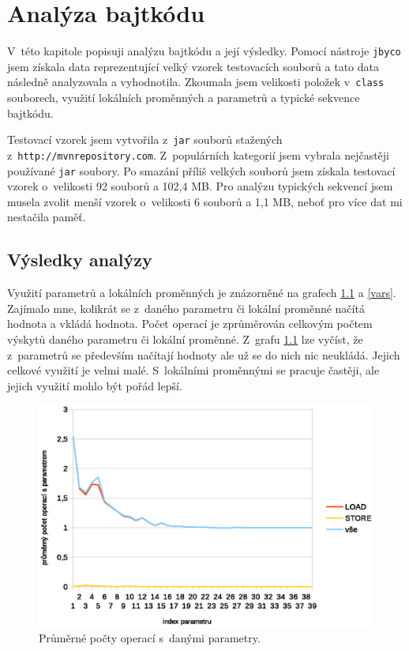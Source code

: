 \chapter{Analýza bajtkódu}\label{Analysis}


V~této kapitole popisuji analýzu bajtkódu a její výsledky. Pomocí nástroje \texttt{jbyco} jsem získala data reprezentující velký vzorek testovacích souborů a tato data následně analyzovala a vyhodnotila. Zkoumala jsem velikosti položek v~\texttt{class} souborech, využití lokálních proměnných a parametrů a typické sekvence bajtkódu.

Testovací vzorek jsem vytvořila z~\texttt{jar} souborů stažených z~\texttt{http://mvnrepository.com}. Z~populárních kategorií jsem vybrala nejčastěji používané \texttt{jar} soubory. Po smazání příliš velkých souborů jsem získala testovací vzorek o~velikosti 92 souborů a 102,4 MB. Pro analýzu typických sekvencí jsem musela zvolit menší vzorek o~velikosti 6 souborů a 1,1 MB, neboť pro více dat mi nestačila paměť.

\section{Výsledky analýzy}\label{AnalysisResults}

Využití parametrů a lokálních proměnných je znázorněné na grafech \ref{params} a \ref{vars}. Zajímalo mne, kolikrát se z~daného parametru či lokální proměnné načítá hodnota a vkládá hodnota. Počet operací je zprůměrován celkovým počtem výskytů daného parametru či lokální proměnné. Z~grafu \ref{params} lze vyčíst, že z~parametrů se především načítají hodnoty ale už se do nich nic neukládá. Jejich celkové využití je velmi malé. S~lokálními proměnnými se pracuje častěji, ale jejich využití mohlo být pořád lepší.

\begin{figure}[h!]
\centering
\includegraphics[scale=0.9]{fig/params}
\caption{Průměrné počty operací s~danými parametry.}\label{params}
\end{figure}


